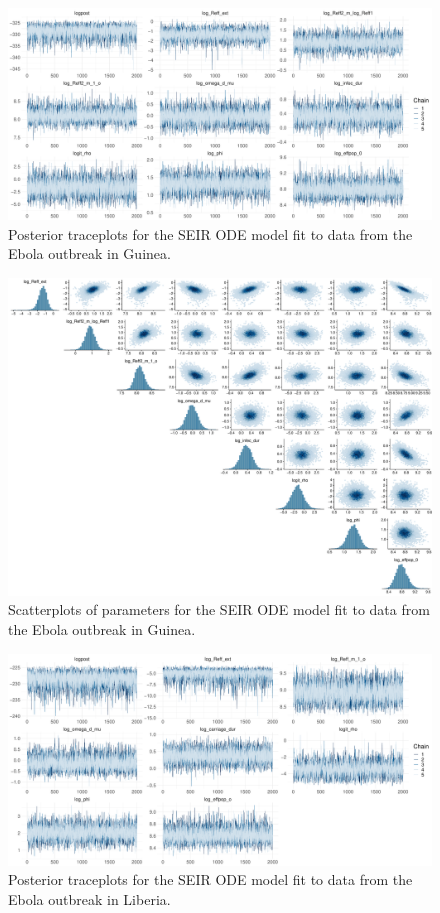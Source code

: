 \begin{figure}
	\centering
	\includegraphics[width=\linewidth]{figures/guin_tight_traces_ode}
	\caption{Posterior traceplots for the SEIR ODE model fit to data from the Ebola outbreak in Guinea.}
	\label{fig:guineatracesode}
\end{figure}

\begin{figure}[htbp]
	\centering
	\includegraphics[width=\linewidth]{figures/guin_tight_pairs_ode}
	\caption{Scatterplots of parameters for the SEIR ODE model fit to data from the Ebola outbreak in Guinea.}
	\label{fig:guineapairsode}
\end{figure}

\begin{figure}
	\centering
	\includegraphics[width=\linewidth]{figures/lib_tight_traces_ode}
	\caption{Posterior traceplots for the SEIR ODE model fit to data from the Ebola outbreak in Liberia.}
	\label{fig:liberiatracesode}
\end{figure}

